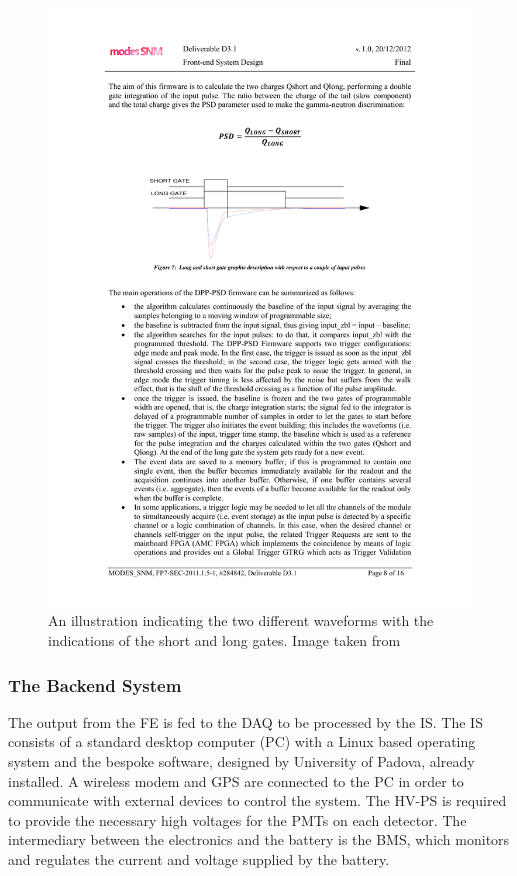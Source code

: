 \begin{figure}[htbp]
\begin{center}
\includegraphics[width=140mm]{Chapter5/figures/digitiserGates.pdf}
\caption{An illustration indicating the two different waveforms with the indications of the short and long gates. Image taken from \cite{modesInternal}}
\label{fig:modesDigitiserGates}
\end{center}
\end{figure}

\subsubsection{The Backend System}
The output from the FE is fed to the DAQ to be processed by the IS. The IS consists of a standard desktop computer (PC) with a Linux based operating system and the bespoke software, designed by University of Padova, already installed. A wireless modem and GPS are connected to the PC in order to communicate with external devices to control the system. The HV-PS is required to provide the necessary high voltages for the PMTs on each detector. The intermediary between the electronics and the battery is the BMS, which monitors and regulates the current and voltage supplied by the battery.

